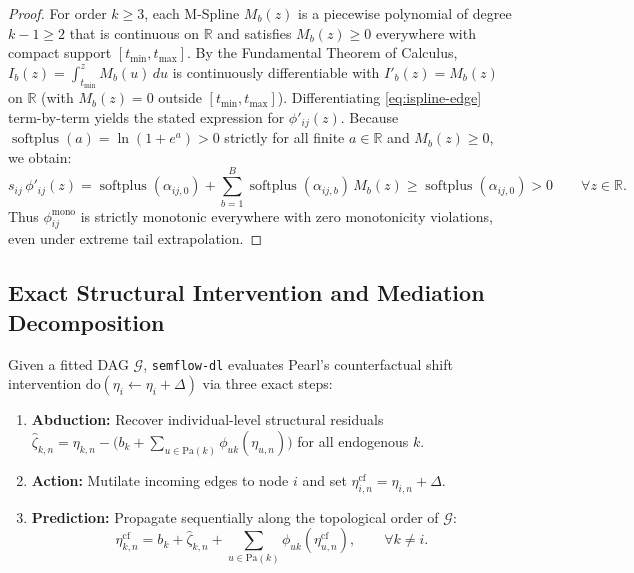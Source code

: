 \begin{proof}
For order $k \ge 3$, each M-Spline $M_b(z)$ is a piecewise polynomial of degree $k - 1 \ge 2$ that is continuous on $\mathbb{R}$ and satisfies $M_b(z) \ge 0$ everywhere with compact support $[t_{\min}, t_{\max}]$. By the Fundamental Theorem of Calculus, $I_b(z) = \int_{t_{\min}}^z M_b(u)\,du$ is continuously differentiable with $I'_b(z) = M_b(z)$ on $\mathbb{R}$ (with $M_b(z) = 0$ outside $[t_{\min}, t_{\max}]$). Differentiating \eqref{eq:ispline-edge} term-by-term yields the stated expression for $\phi'_{ij}(z)$. Because $\operatorname{softplus}(a) = \ln(1 + e^a) > 0$ strictly for all finite $a \in \mathbb{R}$ and $M_b(z) \ge 0$, we obtain:
\[
  s_{ij}\,\phi'_{ij}(z) = \operatorname{softplus}(\alpha_{ij,0}) + \sum_{b=1}^{B}\operatorname{softplus}(\alpha_{ij,b})\,M_b(z) \ge \operatorname{softplus}(\alpha_{ij,0}) > 0 \qquad \forall z \in \mathbb{R}.
\]
Thus $\phi_{ij}^{\mathrm{mono}}$ is strictly monotonic everywhere with zero monotonicity violations, even under extreme tail extrapolation.
\end{proof}

\subsection{Exact Structural Intervention and Mediation Decomposition}
Given a fitted DAG $\mathcal{G}$, \texttt{semflow-dl} evaluates Pearl's counterfactual shift intervention $\mathrm{do}(\eta_i \leftarrow \eta_i + \Delta)$ via three exact steps:
\begin{enumerate}
  \item \textbf{Abduction:} Recover individual-level structural residuals $\hat{\zeta}_{k,n} = \eta_{k,n} - \big(b_k + \sum_{u \in \mathrm{Pa}(k)} \phi_{uk}(\eta_{u,n})\big)$ for all endogenous $k$.
  \item \textbf{Action:} Mutilate incoming edges to node $i$ and set $\eta_{i,n}^{\mathrm{cf}} = \eta_{i,n} + \Delta$.
  \item \textbf{Prediction:} Propagate sequentially along the topological order of $\mathcal{G}$:
  \begin{equation}
    \eta_{k,n}^{\mathrm{cf}} = b_k + \hat{\zeta}_{k,n} + \sum_{u \in \mathrm{Pa}(k)} \phi_{uk}(\eta_{u,n}^{\mathrm{cf}}), \qquad \forall k \neq i.
  \end{equation}
\end{enumerate}

